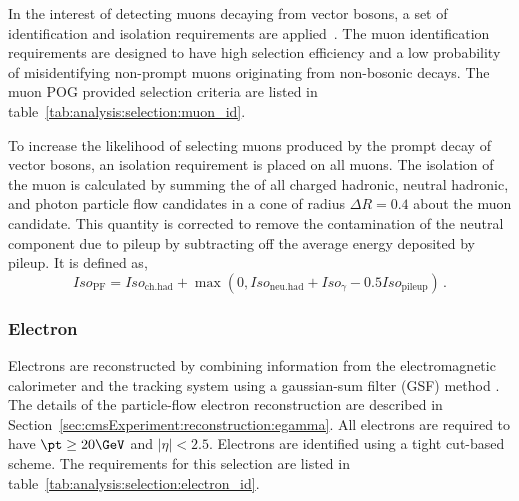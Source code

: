 In the interest of detecting muons decaying from vector bosons, a set of identification and isolation requirements are applied~\cite{Sirunyan:2018fpa}. The muon identification requirements are designed to have high selection efficiency and a low probability of misidentifying non-prompt muons originating from non-bosonic decays. The muon POG provided selection criteria are listed in table~\ref{tab:analysis:selection:muon_id}.



\noindent To increase the likelihood of selecting muons produced by the prompt decay of vector bosons, an isolation requirement is placed on all muons. The isolation of the muon is calculated by summing the \pt of all charged hadronic, neutral hadronic, and photon particle flow candidates in a cone of radius $\Delta R = 0.4$ about the muon candidate. This quantity is corrected to remove the contamination of the neutral component due to pileup by subtracting off the average energy deposited by pileup. It is defined as,
\begin{equation*} 
    Iso_\mathrm{PF} = Iso_\mathrm{ ch. had} + \max\left(0, Iso_\mathrm{ neu. had} + Iso_{\gamma} - 0.5 Iso_\mathrm{ pileup}\right)\,.
\end{equation*}








\subsubsection{Electron}

Electrons are reconstructed by combining information from the electromagnetic calorimeter and the tracking system using a gaussian-sum filter (GSF) method \cite{Baffioni:2006cd}. The details of the particle-flow electron reconstruction are described in Section~\ref{sec:cmsExperiment:reconstruction:egamma}. All electrons are required to have $\pt \geq 20 \GeV$ and $|\eta| < 2.5$.  Electrons are identified using a tight cut-based scheme. The requirements for this selection are listed in table~\ref{tab:analysis:selection:electron_id}.



